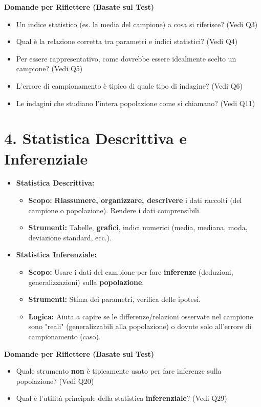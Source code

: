 \documentclass[12pt, a4paper]{article}
\newenvironment{reflectionbox}{%
    \begin{framed}\par\medskip\noindent
    \textbf{\color{boxtitlecolor}Domande per Riflettere (Basate sul Test)} \par
    \begin{itemize}[leftmargin=*, label=$\blacktriangleright$]
}{%
    \end{itemize}\par\medskip
    \end{framed}
}
\begin{document}
\begin{reflectionbox}
    \item Un indice statistico (es. la media del campione) a cosa si riferisce? (Vedi Q3)
    \item Qual è la relazione corretta tra parametri e indici statistici? (Vedi Q4)
    \item Per essere rappresentativo, come dovrebbe essere idealmente scelto un campione? (Vedi Q5)
    \item L'errore di campionamento è tipico di quale tipo di indagine? (Vedi Q6)
    \item Le indagini che studiano l'intera popolazione come si chiamano? (Vedi Q11)
\end{reflectionbox}

\section*{4. Statistica Descrittiva e Inferenziale}
\begin{itemize}
    \item \textbf{Statistica Descrittiva:}
        \begin{itemize}
            \item \textbf{Scopo:} \textbf{Riassumere, organizzare, descrivere} i dati raccolti (del campione o popolazione). Rendere i dati comprensibili.
            \item \textbf{Strumenti:} Tabelle, \textbf{grafici}, indici numerici (media, mediana, moda, deviazione standard, ecc.).
        \end{itemize}
    \item \textbf{Statistica Inferenziale:}
        \begin{itemize}
            \item \textbf{Scopo:} Usare i dati del campione per fare \textbf{inferenze} (deduzioni, generalizzazioni) sulla \textbf{popolazione}.
            \item \textbf{Strumenti:} Stima dei parametri, verifica delle ipotesi.
            \item \textbf{Logica:} Aiuta a capire se le differenze/relazioni osservate nel campione sono "reali" (generalizzabili alla popolazione) o dovute solo all'errore di campionamento (caso).
        \end{itemize}
\end{itemize}

\begin{reflectionbox}
    \item Quale strumento \textbf{non} è tipicamente usato per fare inferenze sulla popolazione? (Vedi Q20)
    \item Qual è l'utilità principale della statistica \textbf{inferenziale}? (Vedi Q29)
\end{reflectionbox}
\end{document}
